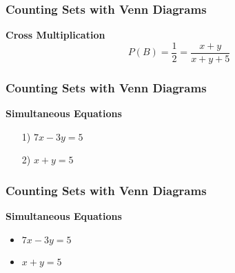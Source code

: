 \documentclass[IntroMain.tex]{subfiles}
\begin{document}
\begin{frame}
\frametitle{Counting Sets with Venn Diagrams}
\Large
\vspace{-2.5cm}
\textbf{Cross Multiplication}
\[ P(B) = \frac{1}{2} = \frac{x+y}{x+y+5} \]

\end{frame}


\begin{frame}
\frametitle{Counting Sets with Venn Diagrams}
\Large
\vspace{-2.8cm}
\textbf{Simultaneous Equations}
\begin{itemize}
\item[1)] $7x-3y=5$
\item[2)] $x+y=5$
\end{itemize}
\end{frame}

\begin{frame}
\frametitle{Counting Sets with Venn Diagrams}
\Large
\vspace{-2.8cm}
\textbf{Simultaneous Equations}
\begin{itemize}
\item $7x-3y=5$
\item $x+y=5$
\end{itemize}
\end{frame}
\end{document}

